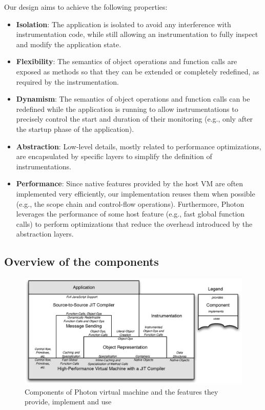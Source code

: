 Our design aims to achieve the following properties:
\begin{itemize}
    \item \textbf{Isolation}: The application is isolated to avoid any
        interference with instrumentation code, while still allowing an
        instrumentation to fully inspect and modify the application state.
    \item \textbf{Flexibility}: The semantics of object operations and function
        calls are exposed as methods so that they can be extended or
        completely redefined, as required by the instrumentation.
    \item \textbf{Dynamism}: The semantics of object operations and function
        calls can be redefined while the application is running to allow
        instrumentations to precisely control the start and duration
        of their monitoring (e.g., only after the startup phase of the application).
    \item \textbf{Abstraction}: Low-level details, mostly related to
        performance optimizations, are encapsulated by specific layers to
        simplify the definition of instrumentations.
    \item \textbf{Performance}:
        Since native features provided by the host VM are often implemented
        very efficiently, our implementation reuses them when possible (e.g.,
        the scope chain and control-flow operations). Furthermore, Photon
        leverages the performance of some host feature (e.g., fast global
        function calls) to perform optimizations that reduce the overhead
        introduced by the abstraction layers.
\end{itemize}

\subsection{Overview of the components}

\begin{figure}[htb]
\begin{center}
\includegraphics[width=1.0\textwidth]{figures/architecture}
\caption{\label{fig:Architecture} Components of Photon virtual machine
and the features they provide, implement and use}
\end{center}
\end{figure}

